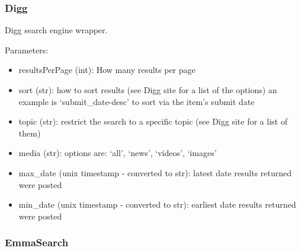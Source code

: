 \documentclass[letterpaper,10pt,english]{sphinxmanual}
\begin{document}
\subsubsection{Digg}
\label{api3.0:digg}

\begin{fulllineitems}
\label{api3.0:puppy.search.engine.Digg}
Digg search engine wrapper.

Parameters:
\begin{itemize}
\item {} 
resultsPerPage (int): How many results per page

\item {} 
sort (str): how to sort results (see Digg site for a list of the options) an example is `submit\_date-desc' to sort via the item's submit date

\item {} 
topic (str): restrict the search to a specific topic (see Digg site for a list of them)

\item {} 
media (str): options are: `all', `news', `videos', `images'

\item {} 
max\_date (unix timestamp - converted to str): latest date results returned were posted

\item {} 
min\_date (unix timestamp - converted to str): earliest date results returned were posted

\end{itemize}

\end{fulllineitems}



\subsubsection{EmmaSearch}
\label{api3.0:emmasearch}
\end{document}
